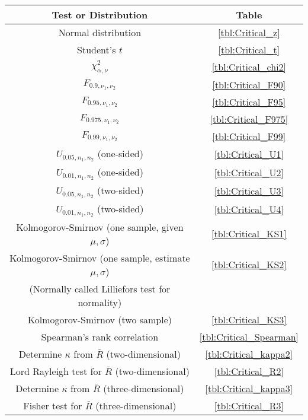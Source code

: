 \begin{table}[H]
\centering
\begin{tabular}{|c|c|} \hline
\bf{Test or Distribution} &  \bf{Table} \\ \hline
\rule{0pt}{2ex}Normal distribution &  \ref{tbl:Critical_z} \\[2pt] \hline
\rule{0pt}{2ex}Student's $t$ &  \ref{tbl:Critical_t} \\[2pt] \hline
\rule{0pt}{2ex}$\chi^2_{\alpha,\nu}$ &  \ref{tbl:Critical_chi2} \\[2pt] \hline
\rule{0pt}{2ex}$F_{0.9,\nu_1,\nu_2}$ &  \ref{tbl:Critical_F90} \\[2pt] \hline
\rule{0pt}{2ex}$F_{0.95,\nu_1,\nu_2}$ &  \ref{tbl:Critical_F95} \\[2pt] \hline
\rule{0pt}{2ex}$F_{0.975,\nu_1,\nu_2}$ &  \ref{tbl:Critical_F975} \\[2pt] \hline
\rule{0pt}{2ex}$F_{0.99,\nu_1,\nu_2}$ &  \ref{tbl:Critical_F99} \\[2pt] \hline
\rule{0pt}{2ex}$U_{0.05,n_1,n_2}$ (one-sided) &  \ref{tbl:Critical_U1} \\[2pt] \hline
\rule{0pt}{2ex}$U_{0.01,n_1,n_2}$ (one-sided) &  \ref{tbl:Critical_U2} \\[2pt] \hline
\rule{0pt}{2ex}$U_{0.05,n_1,n_2}$ (two-sided) &  \ref{tbl:Critical_U3} \\[2pt] \hline
\rule{0pt}{2ex}$U_{0.01,n_1,n_2}$ (two-sided) &  \ref{tbl:Critical_U4} \\[2pt] \hline
\rule{0pt}{2ex}Kolmogorov-Smirnov (one sample, given $\mu, \sigma$) &  \ref{tbl:Critical_KS1} \\[2pt] \hline
\rule{0pt}{2ex}Kolmogorov-Smirnov (one sample, estimate $\mu, \sigma$) &  \ref{tbl:Critical_KS2} \\
(Normally called Lilliefors test for normality) &  \\[2pt] \hline
\rule{0pt}{2ex}Kolmogorov-Smirnov (two sample) &  \ref{tbl:Critical_KS3} \\[2pt] \hline
\rule{0pt}{2ex}Spearman's rank correlation &  \ref{tbl:Critical_Spearman} \\[2pt] \hline
\rule{0pt}{2ex}Determine $\kappa$ from $\bar{R}$ (two-dimensional) &  \ref{tbl:Critical_kappa2} \\[2pt] \hline
\rule{0pt}{2ex}Lord Rayleigh test for $\bar{R}$ (two-dimensional) &  \ref{tbl:Critical_R2} \\[2pt] \hline
\rule{0pt}{2ex}Determine $\kappa$ from $\bar{R}$ (three-dimensional) &  \ref{tbl:Critical_kappa3} \\[2pt] \hline
\rule{0pt}{2ex}Fisher test for $\bar{R}$ (three-dimensional) &  \ref{tbl:Critical_R3} \\[2pt] \hline
\end{tabular}
\end{table}

